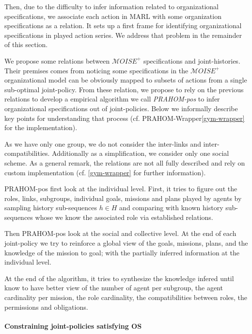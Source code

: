 \documentclass[runningheads]{llncs}
\newcounter{relation}
\begin{document}
Then, due to the difficulty to infer information related to organizational specifications, we associate each action in MARL with some organization specifications as a  relation. It sets up a first frame for identifying organizational specifications in played action series. We address that problem in the remainder of this section.

We propose some relations between $\mathcal{M}OISE^+$ specifications and joint-histories. Their premises comes from noticing some specifications in the $\mathcal{M}OISE^+$ organizational model can be obviously mapped to subsets of actions from a single sub-optimal joint-policy.
From these relation, we propose to rely on the previous relations to develop a empirical algorithm we call \emph{PRAHOM-pos} to infer organizational specifications out of joint-policies. Below we informally describe key points for understanding that process (cf. PRAHOM-Wrapper\ref{gym-wrapper} for the implementation).

As we have only one group, we do not consider the inter-links and inter-compatibilities. Additionally as a simplification, we consider only one social scheme. As a general remark, the  relations are not all fully described and rely on custom implementation (cf. \autoref{gym-wrapper} for further information).

PRAHOM-pos first look at the individual level.
First, it tries to figure out the roles, links, subgroups, individual goals, missions and plans played by agents by sampling history sub-sequences $h \in H$ and comparing with known history sub-sequences whose we know the associated role via established relations.

Then PRAHOM-pos look at the social and collective level.
At the end of each joint-policy we try to reinforce a global view of the goals, missions, plans, and the knowledge of the mission to goal; with the partially inferred information at the individual level.

At the end of the algorithm, it tries to synthesize the knowledge infered until know to have better view of the number of agent per subgroup, the agent cardinality per mission, the role cardinality, the compatibilities between roles, the permissions and obligations.


\paragraph{\textbf{Constraining joint-policies satisfying OS}}
\end{document}
